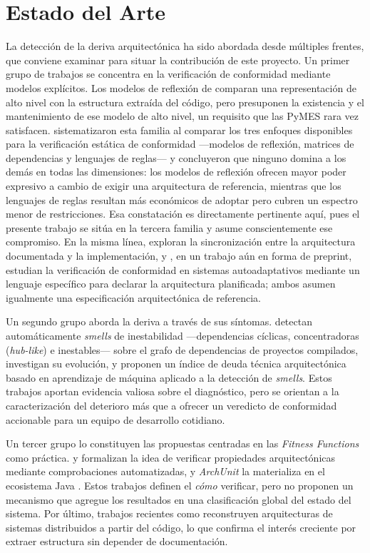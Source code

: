 \section{Estado del Arte}
La detección de la deriva arquitectónica ha sido abordada desde múltiples frentes, que conviene examinar para situar la contribución de este proyecto. Un primer grupo de trabajos se concentra en la verificación de conformidad mediante modelos explícitos. Los modelos de reflexión de \citet{Murphy2001} comparan una representación de alto nivel con la estructura extraída del código, pero presuponen la existencia y el mantenimiento de ese modelo de alto nivel, un requisito que las PyMES rara vez satisfacen. \citet{KnodelPopescu2007} sistematizaron esta familia al comparar los tres enfoques disponibles para la verificación estática de conformidad —modelos de reflexión, matrices de dependencias y lenguajes de reglas— y concluyeron que ninguno domina a los demás en todas las dimensiones: los modelos de reflexión ofrecen mayor poder expresivo a cambio de exigir una arquitectura de referencia, mientras que los lenguajes de reglas resultan más económicos de adoptar pero cubren un espectro menor de restricciones. Esa constatación es directamente pertinente aquí, pues el presente trabajo se sitúa en la tercera familia y asume conscientemente ese compromiso. En la misma línea, \citet{ArchSyncJAndres} exploran la sincronización entre la arquitectura documentada y la implementación, y \citet{SanMartin}, en un trabajo aún en forma de preprint, estudian la verificación de conformidad en sistemas autoadaptativos mediante un lenguaje específico para declarar la arquitectura planificada; ambos asumen igualmente una especificación arquitectónica de referencia.

Un segundo grupo aborda la deriva a través de sus síntomas. \citet{ArcelliFontana2016} detectan automáticamente \textit{smells} de inestabilidad ---dependencias cíclicas, concentradoras (\textit{hub-like}) e inestables--- sobre el grafo de dependencias de proyectos compilados, \citet{Sas2019} investigan su evolución, y \citet{SasAvgeriou} proponen un índice de deuda técnica arquitectónica basado en aprendizaje de máquina aplicado a la detección de \textit{smells}. Estos trabajos aportan evidencia valiosa sobre el diagnóstico, pero se orientan a la caracterización del deterioro más que a ofrecer un veredicto de conformidad accionable para un equipo de desarrollo cotidiano.

Un tercer grupo lo constituyen las propuestas centradas en las \textit{Fitness Functions} como práctica. \citet{PaulWang2019} y \citet{Ford2022} formalizan la idea de verificar propiedades arquitectónicas mediante comprobaciones automatizadas, y \textit{ArchUnit} la materializa en el ecosistema Java \citep{ArchUnit}. Estos trabajos definen el \textit{cómo} verificar, pero no proponen un mecanismo que agregue los resultados en una clasificación global del estado del sistema. Por último, trabajos recientes como \citet{Manglaras2026} reconstruyen arquitecturas de sistemas distribuidos a partir del código, lo que confirma el interés creciente por extraer estructura sin depender de documentación.

